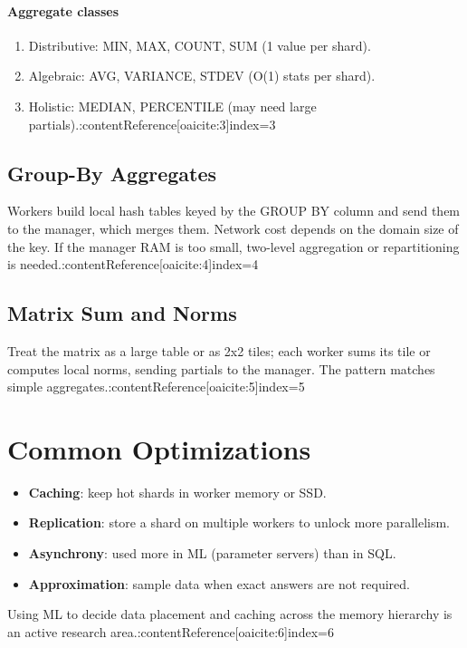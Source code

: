 \documentclass[11pt]{article}
\begin{document}
\paragraph{Aggregate classes}

\begin{enumerate}[itemsep=0pt]
  \item Distributive: MIN, MAX, COUNT, SUM (1 value per shard).
  \item Algebraic: AVG, VARIANCE, STDEV (O(1) stats per shard).
  \item Holistic: MEDIAN, PERCENTILE (may need large partials).:contentReference[oaicite:3]{index=3}
\end{enumerate}

\subsection{Group-By Aggregates}

Workers build local hash tables keyed by the GROUP BY column and send them to the manager, which merges them.  Network cost depends on the domain size of the key.  If the manager RAM is too small, two-level aggregation or repartitioning is needed.:contentReference[oaicite:4]{index=4}

\subsection{Matrix Sum and Norms}

Treat the matrix as a large table or as 2x2 tiles; each worker sums its tile or computes local norms, sending partials to the manager.  The pattern matches simple aggregates.:contentReference[oaicite:5]{index=5}

\section{Common Optimizations}

\begin{itemize}[itemsep=0pt]
  \item \textbf{Caching}: keep hot shards in worker memory or SSD.
  \item \textbf{Replication}: store a shard on multiple workers to unlock more parallelism.
  \item \textbf{Asynchrony}: used more in ML (parameter servers) than in SQL.
  \item \textbf{Approximation}: sample data when exact answers are not required.
\end{itemize}
Using ML to decide data placement and caching across the memory hierarchy is an active research area.:contentReference[oaicite:6]{index=6}
\end{document}
